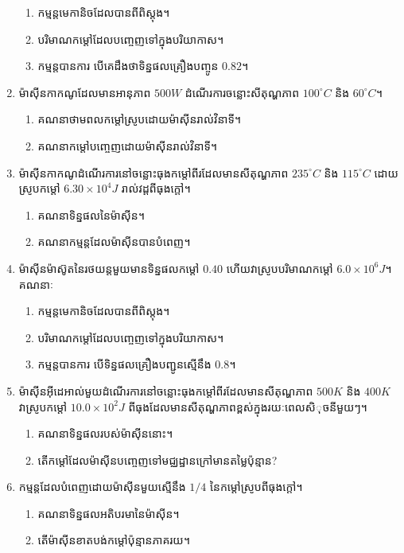 \begin{enumerate}
\begin{enumerate}
			\item កម្មន្តមេកានិចដែលបានពីពិស្តុង។
			\item បរិមាណកម្តៅដែលបញ្ចេញទៅក្នុងបរិយាកាស។
			\item កម្មន្តបានការ បើគេដឹងថាទិន្នផលគ្រឿងបញ្ចូន $0.82$។
		\end{enumerate} 
		\item ម៉ាសុីនកាកណូដែលមានអានុភាព $500W$ ដំណើរការចន្លោះសីតុណ្ហភាព $100^\circ C$ និង $60^\circ C$។ 
		\begin{enumerate}
			\item គណនាថាមពលកម្តៅស្រូបដោយម៉ាសុីនរាល់វិនាទី។
			\item គណនាកម្តៅបញ្ចេញដោយម៉ាសុីនរាល់វិនាទី។
		\end{enumerate}
		\item ម៉ាសុីនកាកណូដំណើរការនៅចន្លោះធុងកម្តៅពីរដែលមានសីតុណ្ហភាព $235^\circ C$ និង $115^\circ C$ ដោយស្រូបកម្តៅ $6.30\times10^{4}J$ រាល់វដ្តពីធុងក្តៅ។
		\begin{enumerate}
			\item គណនាទិន្នផលនៃម៉ាសុីន។
			\item គណនាកម្មន្តដែលម៉ាសុីនបានបំពេញ។
		\end{enumerate}
		\item ម៉ាសុីនម៉ាស៊ូតនៃរថយន្តមួយមានទិន្នផលកម្តៅ $0.40$ ហើយវាស្រូបបរិមាណកម្តៅ $6.0\times10^{6}J$។ គណនាៈ
		\begin{enumerate}
			\item កម្មន្តមេកានិចដែលបានពីពិស្តុង។
			\item បរិមាណកម្តៅដែលបញ្ចេញទៅក្នុងបរិយាកាស។
			\item កម្មន្តបានការ បើទិន្នផលគ្រឿងបញ្ជូនស្មើនឹង $0.8$។
		\end{enumerate}
		\item ម៉ាសុីនអុីដេអាល់មួយដំណើរការនៅចន្លោះធុងកម្តៅពីរដែលមានសីតុណ្ហភាព $500K$ និង $400K$ វាស្រូបកម្តៅ $10.0\times10^{2}J$ ពីធុងដែលមានសីតុណ្ហភាពខ្ពស់ក្នុងរយៈពេលសិុចនីមួយៗ។
		\begin{enumerate}
			\item គណនាទិន្នផលរបស់ម៉ាសុីននោះ។
			\item តើកម្តៅដែលម៉ាសុីនបញ្ចេញទៅមជ្ឈដ្ឋានក្រៅមានតម្លៃប៉ុន្មាន?
		\end{enumerate}
		\item កម្មន្តដែលបំពេញដោយម៉ាសុីនមួយស្មើនឹង $1/4$ នៃកម្តៅស្រូបពីធុងក្តៅ។
		\begin{enumerate}
			\item គណនាទិន្នផលអតិបរមានៃម៉ាសុីន។
			\item តើម៉ាសុីនខាតបង់កម្តៅប៉ុន្មានភាគរយ។
		\end{enumerate}

\end{enumerate}
